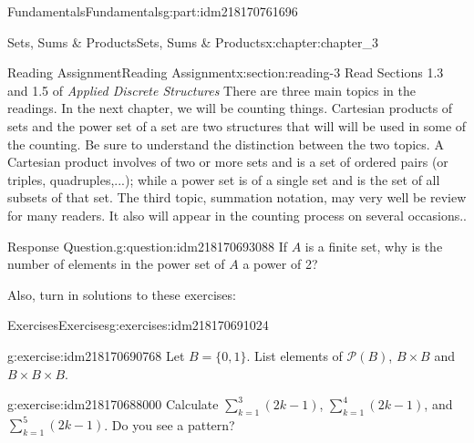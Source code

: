 \documentclass[oneside,10pt,]{book}
\numberwithin{equation}{section}
\begin{document}
\begin{partptx}{Fundamentals}{}{Fundamentals}{}{}{g:part:idm218170761696}
\begin{chapterptx}{Sets, Sums \& Products}{}{Sets, Sums \& Products}{}{}{x:chapter:chapter_3}
%
%
%
%
%
\typeout{************************************************}
\typeout{************************************************}
%
\begin{sectionptx}{Reading Assignment}{}{Reading Assignment}{}{}{x:section:reading-3}
Read Sections 1.3 and 1.5 of \emph{Applied Discrete Structures} There are three main topics in the readings.  In the next chapter, we will be counting things.  Cartesian products of sets and the power set of a set are two structures that will will be used in some of the counting.  Be sure to understand the distinction between the two topics.  A Cartesian product involves of two or more sets and is a set of ordered pairs (or triples, quadruples,...); while a power set is of a single set and is the set of all subsets of that set.    The third topic, summation notation, may very well be review for many readers. It also will appear in the counting process on several occasions..%
\begin{question}{Response Question.}{g:question:idm218170693088}%
If \(A\) is a finite set, why is the number of elements in the power set of \(A\) a power of 2?%
\end{question}
Also, turn in solutions to these exercises:%
%
%
\typeout{************************************************}
\typeout{************************************************}
%
\begin{exercises-subsection-numberless}{Exercises}{}{Exercises}{}{}{g:exercises:idm218170691024}
\par\medskip\noindent%
%
\begin{exercisegroup}
\begin{divisionexerciseeg}{1}{}{}{g:exercise:idm218170690768}%
Let \(B=\{0,1\}\).  List elements of  \(\mathcal{P}(B)\),  \(B\times B\) and \(B\times B\times B\).%
\end{divisionexerciseeg}%
\begin{divisionexerciseeg}{2}{}{}{g:exercise:idm218170688000}%
Calculate \(\sum_{k=1}^3 (2k-1)\), \(\sum_{k=1}^4 (2k-1)\), and \(\sum_{k=1}^5 (2k-1)\). Do you see a pattern?%
\end{divisionexerciseeg}%
\end{exercisegroup}
\par\medskip\noindent
\end{exercises-subsection-numberless}
\end{sectionptx}
%
%
\typeout{************************************************}

\end{chapterptx}
\end{partptx}
\end{document}
